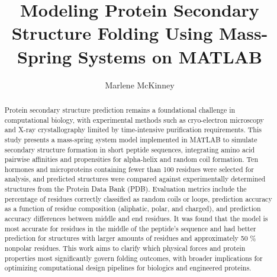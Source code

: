 \documentclass[aps,prl,reprint]{revtex4-2}
\begin{document}
\title{Modeling Protein Secondary Structure Folding Using Mass-Spring Systems on MATLAB}
\author{Marlene McKinney}
  
\begin{abstract}
Protein secondary structure prediction remains a foundational challenge in computational biology, with experimental methods such as cryo-electron microscopy and X-ray crystallography limited by time-intensive purification requirements. This study presents a mass-spring system model implemented in MATLAB to simulate secondary structure formation in short peptide sequences, integrating amino acid pairwise affinities and propensities for alpha-helix and random coil formation. Ten hormones and microproteins containing fewer than 100 residues were selected for analysis, and predicted structures were compared against experimentally determined structures from the Protein Data Bank (PDB). Evaluation metrics include the percentage of residues correctly classified as random coils or loops, prediction accuracy as a function of residue composition (aliphatic, polar, and charged), and prediction accuracy differences between middle and end residues. It was found that the model is most accurate for residues in the middle of the peptide's sequence and had better prediction for structures with larger amounts of residues and approximately 50 $\%$ nonpolar residues. This work aims to clarify which physical forces and protein properties most significantly govern folding outcomes, with broader implications for optimizing computational design pipelines for biologics and engineered proteins.
\end{abstract}

\maketitle
\end{document}
